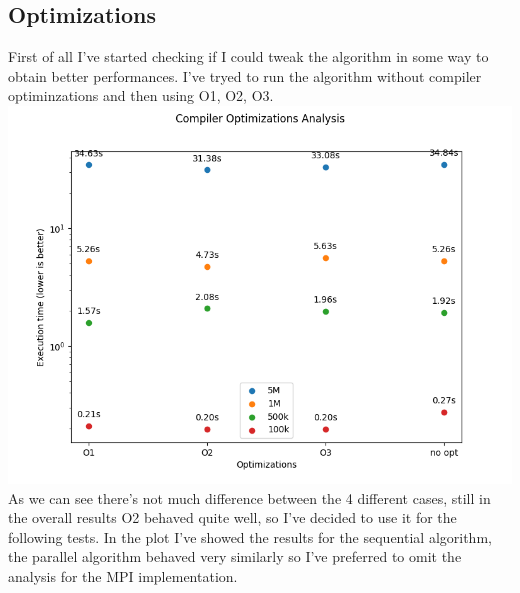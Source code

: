 \documentclass{article}
\begin{document}
\subsection*{Optimizations}
First of all I've started checking if I could tweak the algorithm in some way to obtain better
performances. I've tryed to run the algorithm without compiler optiminzations and then using 
O1, O2, O3.\\
\includegraphics[scale=.6]{opt_boxplot.png}
As we can see there's not much difference between the 4 different cases, still in the overall results
O2 behaved quite well, so I've decided to use it for the following tests. In the plot I've showed the results for
the sequential algorithm, the parallel algorithm behaved very similarly so I've preferred to omit the analysis
for the MPI implementation.
\end{document}

